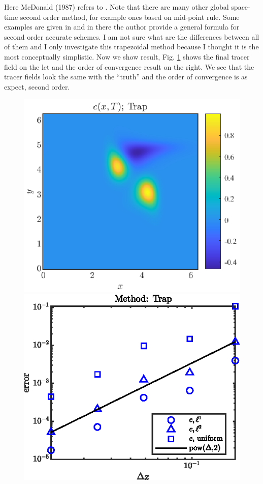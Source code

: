 \documentclass[11pt,letterpaper]{article}
\begin{document}
Here McDonald (1987) refers to \cite{mcdonald1987}. Note that there are many other global space-time second order method, for example ones based on mid-point rule. Some examples are given in \cite{mcdonald1999} and in there the author provide a general formula for second order accurate schemes. I am not sure what are the differences between all of them and I only investigate this trapezoidal method because I thought it is the most conceptually simplistic. Now we show result, Fig. \ref{fig:c_final_Trap} shows the final tracer field on the let and the order of convergence result on the right. We see that the tracer fields look the same with the ``truth'' and the order of convergence is as expect, second order.
\begin{figure}[H]
    \centering
    \includegraphics{figs/c_final_Trap}
    \includegraphics{figs/conv_order_Trap}
    \caption{}\label{fig:c_final_Trap}
\end{figure}
\end{document}
